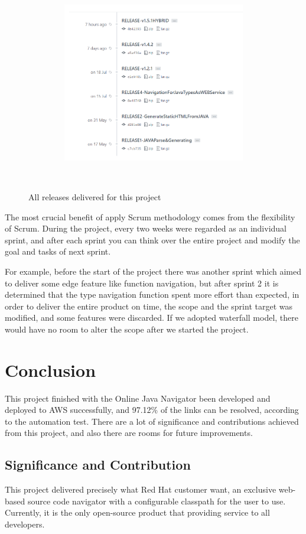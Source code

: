 \documentclass[runningheads]{llncs}
\begin{document}
\begin{figure}[H]
    \centering
    \includegraphics[width=8cm]{pic/github-release.png}
    \caption{All releases delivered for this project\cite{ojn-releases}}
    \label{All releases delivered for this project}
\end{figure}

The most crucial benefit of apply Scrum methodology comes from the flexibility of Scrum. During the project, every two weeks were regarded as an individual sprint, and after each sprint you can think over the entire project and modify the goal and tasks of next sprint. 

For example, before the start of the project there was another sprint which aimed to deliver some edge feature like function navigation, but after sprint 2 it is determined that the type navigation function spent more effort than expected, in order to deliver the entire product on time, the scope and the sprint target was modified, and some features were discarded. If we adopted waterfall model, there would have no room to alter the scope after we started the project.
	
\section{Conclusion}
This project finished with the Online Java Navigator been developed and deployed to AWS successfully, and 97.12\% of the links can be resolved, according to the automation test. There are a lot of significance and contributions achieved from this project, and also there are rooms for future improvements.

\subsection{Significance and Contribution}
This project delivered precisely what Red Hat customer want, an exclusive web-based source code navigator with a configurable classpath for the user to use.  Currently, it is the only open-source product that providing service to all developers.
\end{document}
